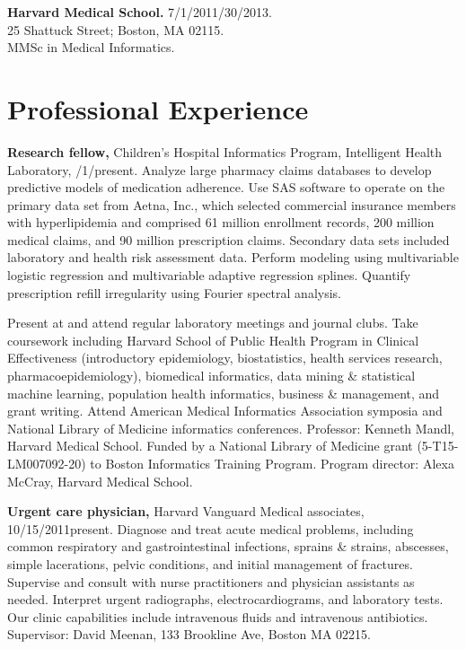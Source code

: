 \documentclass[12pt]{article}
\begin{document}
\textbf{Harvard Medical School.} 7/1/2011/30/2013.\\
25 Shattuck Street; Boston, MA 02115.\\
MMSc in Medical Informatics.

\newpage

\section*{Professional Experience} %

\textbf{Research fellow,} Children’s Hospital Informatics Program,
Intelligent Health Lab\-o\-ra\-to\-ry,
/1/\ndash{}\linebreak[0]pres\-ent.
Analyze large pharmacy claims databases to develop predictive models
of medication adherence. Use SAS software to operate on the primary
data set from Aetna, Inc., which selected commercial insurance members
with hyperlipidemia and comprised 61 million enrollment records, 200
million medical claims, and 90 million prescription claims. Secondary
data sets included laboratory and health risk assessment data. Perform
modeling using multivariable logistic regression and multivariable
adaptive regression splines. Quantify prescription refill irregularity
using Fourier spectral analysis.

Present at and attend regular laboratory meetings and journal clubs.
Take coursework including Harvard School of Public Health Program in
Clinical Effectiveness (introductory epidemiology, biostatistics,
health services research, pharmacoepidemiology), biomedical
informatics, data mining \& statistical machine learning, population
health informatics, business \& management, and grant writing. Attend
American Medical Informatics Association symposia and National Library
of Medicine informatics conferences. Professor: Kenneth Mandl, Harvard
Medical School. Funded by a National Library of Medicine grant
(5-T15-LM007092-20) to Boston Informatics Training Program. Program
director: Alexa McCray, Harvard Medical School.

\textbf{Urgent care physician,} Harvard Vanguard Medical associates,
10/15/2011\ndash{}present. Diagnose and treat acute medical problems,
including common respiratory and gastrointestinal infections, sprains
\& strains, abscesses, simple lacerations, pelvic conditions, and
initial management of fractures. Supervise and consult with nurse
practitioners and physician assistants as needed. Interpret urgent
radiographs, electrocardiograms, and laboratory tests. Our clinic
capabilities include intravenous fluids and intravenous antibiotics.
Supervisor: David Meenan, 133 Brookline Ave, Boston MA 02215.
\end{document}
